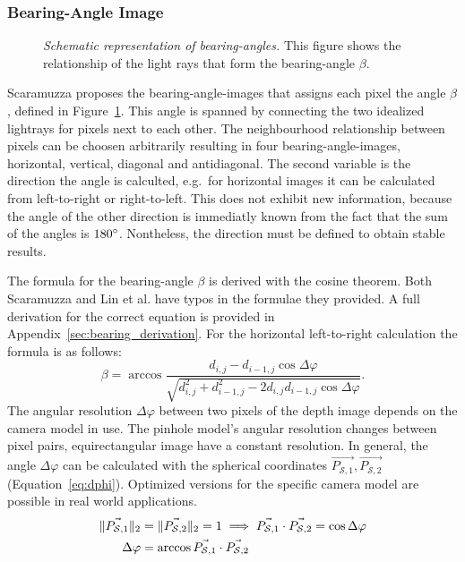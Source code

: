 \subsubsection{Bearing-Angle Image}

\begin{figure}[b!]
    \centering
    \scalebox{0.9}{%
    }
    \caption[Schematic representation of \glspl{bearing-angle}]{\emph{Schematic representation of \glspl{bearing-angle}.} This figure shows the relationship of the light rays that form the \gls{bearing-angle} $\beta$.}\label{fig:bearing_angle}
\end{figure}
Scaramuzza\cite{scaramuzza_iros2007} proposes the \Glspl{bearing-angle-image} that assigns each pixel the angle $\beta$, defined in Figure~\ref{fig:bearing_angle}.
This angle is spanned by connecting the two idealized lightrays for pixels next to each other.
The neighbourhood relationship between pixels can be choosen arbitrarily resulting in four \Glspl{bearing-angle-image}, horizontal, vertical, diagonal and antidiagonal.
The second variable is the direction the angle is calculted, e.g.~for horizontal images it can be calculated from left-to-right or right-to-left.
This does not exhibit new information, because the angle of the other direction is immediatly known from the fact that the sum of the angles is $180\degree$.
Nontheless, the direction must be defined to obtain stable results.

The formula for the \gls{bearing-angle} $\beta$ is derived with the cosine theorem.
Both Scaramuzza\cite{scaramuzza_iros2007} and Lin et al.\cite{lin_easp2017} have typos in the formulae they provided.
A full derivation for the correct equation is provided in Appendix~\ref{sec:bearing_derivation}.
For the horizontal left-to-right calculation the formula is as follows:
\begin{equation}\label{eq:bearing-angle}
    \beta = \arccos%
            \frac{d_{i,j} - d_{i-1,j} \cos \Delta\varphi}%
                {\sqrt{d_{i,j}^2 + d_{i-1,j}^2 - 2 d_{i,j} d_{i-1,j} \cos \Delta\varphi}}\text{.}
\end{equation}
The angular resolution $\Delta\varphi$ between two pixels of the depth image depends on the camera model in use.
The pinhole model's angular resolution changes between pixel pairs, equirectangular image have a constant resolution.
In general, the angle $\Delta\varphi$ can be calculated with the spherical coordinates $\vec{P_{\mathcal{S},1}}, \vec{P_{\mathcal{S},2}}$ (Equation~\ref{eq:dphi}).
Optimized versions for the specific camera model are possible in real world applications.
\begin{equation}
\begin{aligned}
    \lVert\vec{P_{\mathcal{S},1}}\rVert_{2} &= \lVert\vec{P_{\mathcal{S},2}}\rVert_{2} = 1 \implies \vec{P_{\mathcal{S},1}} \cdot \vec{P_{\mathcal{S},2}} = \cos \Delta\varphi \\
    \Delta\varphi &= \arccos \vec{P_{\mathcal{S},1}} \cdot \vec{P_{\mathcal{S},2}}
    \label{eq:dphi}
\end{aligned}
\end{equation}

